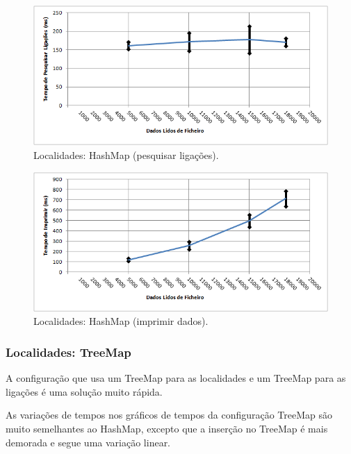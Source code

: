 \documentclass[a5paper,twocolumn, 11pt]{article}
\begin{document}
\begin{figure}[h!b!t!]
    \caption[Localidades: HashMap (pesquisar ligações)]{Localidades: HashMap (pesquisar ligações).}
    \label{hashtable}
    \centering
        \includegraphics[width=400pt]{cloc_conf3_o4.png}
\end{figure}
\begin{figure}[h!b!t!]
    \caption[Localidades: HashMap (imprimir dados)]{Localidades: HashMap (imprimir dados).}
    \label{hashtable}
    \centering
        \includegraphics[width=400pt]{cloc_conf3_o5.png}
\end{figure}

\newpage
\twocolumn
\subsubsection{Localidades: TreeMap}
A configuração que usa um TreeMap para as localidades e um TreeMap para as ligações é uma solução muito rápida.

As variações de tempos nos gráficos de tempos da configuração TreeMap são muito semelhantes ao HashMap, excepto que a inserção no TreeMap é mais demorada e segue uma variação linear.
\end{document}
